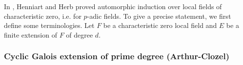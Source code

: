 In \cite{henniart1995automorphic}, Henniart and Herb proved automorphic induction over local fields of characteristic zero, 
i.e. for $p$-adic fields.
To give a precise statement, we first define some terminologies.
Let $F$ be a characteristic zero local field and $E$ be a finite extension of $F$ of degree $d$.


\subsubsection{Cyclic Galois extension of prime degree (Arthur-Clozel)}

\begin{theorem}

\end{theorem}
